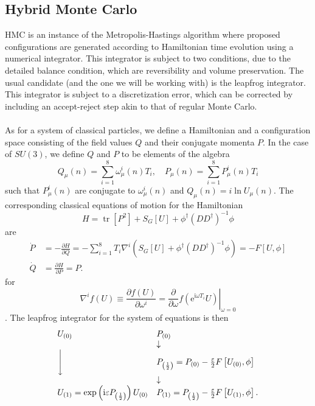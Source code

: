 \documentclass[a4paper,10pt]{book}
\begin{document}
\subsection{Hybrid Monte Carlo}\label{HMC}
HMC is an instance of the Metropolis-Hastings algorithm where proposed configurations are generated according to Hamiltonian time evolution using a numerical integrator. This integrator is subject to two conditions, due to the detailed balance condition, which are reversibility and volume preservation. The usual candidate (and the one we will be working with) is the leapfrog integrator. This integrator is subject to a discretization error, which can be corrected by including an accept-reject step akin to that of regular Monte Carlo.\\\\As for a system of classical particles, we define a Hamiltonian and a configuration space consisting of the field values $Q$ and their conjugate momenta $P$. In the case of $SU(3)$, we define $Q$ and $P$ to be elements of the algebra
\begin{equation}
Q_{\mu}(n) = \sum_{i=1}^{8} \omega_{\mu}^{i}(n) T_{i},\quad P_{\mu}(n)=\sum_{i=1}^{8} P_{\mu}^{i}(n) T_{i}
\end{equation}
such that $P_{\mu}^{i}(n)$ are conjugate to $\omega_{\mu}^{i}(n)$ and 
$Q_{\mu}(n)=i\operatorname{ln}U_{\mu}(n).$
The corresponding classical equations of motion for the Hamiltonian
\begin{equation}
H =\operatorname{tr}\left[P^{2}\right]+S_{G}[U]
+\phi^{\dagger}\left(D D^{\dagger}\right)^{-1} \phi
\end{equation}
are
\begin{equation}
\begin{aligned}
\dot{P} &=-\frac{\partial H}{\partial Q}=-\sum_{i=1}^{8} T_{i} \nabla^{i}\left(S_{G}[U]+\phi^{\dagger}\left(D D^{\dagger}\right)^{-1} \phi\right) =  -F[U, \phi]\\
\dot{Q} &=\frac{\partial H}{\partial P}=P.
\end{aligned}
\end{equation}
for 
\begin{equation}\label{eq:group_derivative}
\nabla^{i} f(U) \equiv \frac{\partial f(U)}{\partial \omega^{i}}=\left.\frac{\partial}{\partial \omega} f\left(\mathrm{e}^{\mathrm{i} \omega T_{i}} U\right)\right|_{\omega=0}
\end{equation}
\cite{Gattringer:2010zz}.
The leapfrog integrator for the system of equations is then
\begin{equation}\label{eq:leapfrog_evolution}
\begin{array}{ll}
U_{(0)} & P_{(0)} \\
 & \downarrow\\\Bigg\downarrow &P_{\left(\frac{1}{2}\right)}=P_{(0)}-\frac{\varepsilon}{2}F\left[ U_{(0)},\phi \right]  \\ &\downarrow
\\
U_{(1)}=\exp \left(\mathrm{i} \varepsilon P_{\left(\frac{1}{2}\right)}\right) U_{(0)} & P_{(1)}=P_{\left(\frac{1}{2}\right)}-\frac{\varepsilon}{2}F\left[ U_{(1)},\phi \right].
\end{array}
\end{equation}
\end{document}
